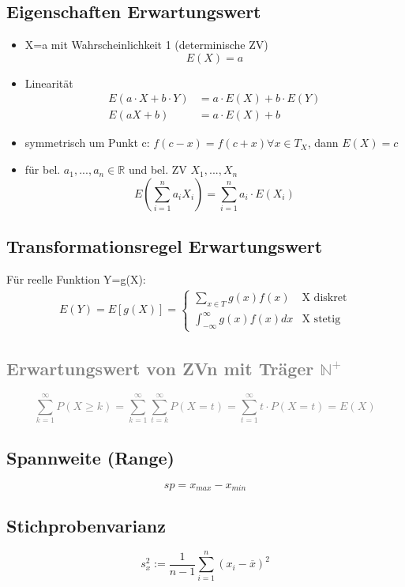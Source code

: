 \documentclass[10pt,a4paper,landscape]{article}
\begin{document}
\begin{multicols}{4}
\subsection{Eigenschaften Erwartungswert}
\begin{itemize}
\item X=a mit Wahrscheinlichkeit 1 (determinische ZV)
\[
E(X)=a
\]
\item Linearität
\begin{align*}
E(a\cdot X + b \cdot Y) &= a\cdot E(X) + b \cdot	E(Y) \\
E(aX+b) &= a\cdot E(X) + b
\end{align*}
\item symmetrisch um Punkt c: $f(c-x)=f(c+x) \forall x \in T_X$, dann $E(X)=c$
\item für bel. $a_1,...,a_n \in \mathbb{R}$ und bel. ZV $X_1,...,X_n$
\[
E\left(\sum_{i=1}^na_iX_i\right)=\sum_{i=1}^na_i \cdot E(X_i)
\]
\end{itemize}

\subsection{Transformationsregel Erwartungswert}
Für reelle Funktion Y=g(X):
\begin{align*}
E(Y)=E[g(X)]=\begin{cases}
\sum_{x\in T}g(x)f(x) &\text{X diskret} \\
\int_{-\infty}^{\infty}g(x)f(x)dx &\text{X stetig}
\end{cases}
\end{align*}

\textcolor{gray}{\subsection{Erwartungswert von ZVn mit Träger $\mathbb{N^+}$}
\[
\sum_{k=1}^{\infty}P(X\geq k)=\sum_{k=1}^{\infty} \sum_{t=k}^{\infty} P(X=t) = \sum_{t=1}^{\infty} t\cdot P(X=t) =E(X)
\]
}

\subsection{Spannweite (Range)}
\[
sp = x_{max}-x_{min}
\]

\subsection{Stichprobenvarianz}
\[
s_x^2 := \frac{1}{n-1}\sum_{i=1}^n(x_i- \overline{x})^2
\]


\end{multicols}
\end{document}
